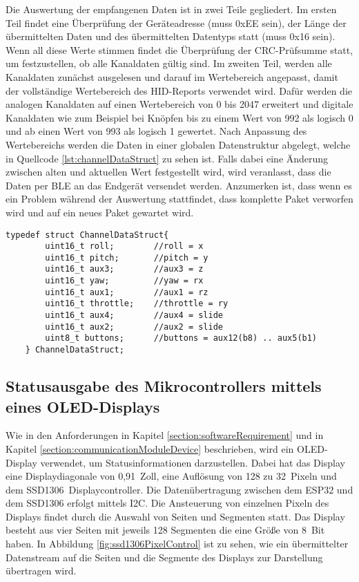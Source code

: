 Die Auswertung der empfangenen Daten ist in zwei Teile gegliedert. Im ersten Teil findet eine Überprüfung der Geräteadresse (muss 0xEE sein), der Länge der übermittelten Daten und des übermittelten Datentyps statt (muss 0x16 sein). Wenn all diese Werte stimmen findet die Überprüfung der \ac{CRC}-Prüfsumme statt, um festzustellen, ob alle Kanaldaten gültig sind. Im zweiten Teil, werden alle Kanaldaten zunächst ausgelesen und darauf im Wertebereich angepasst, damit der vollständige Wertebereich des \ac{HID}-Reports verwendet wird. Dafür werden die analogen Kanaldaten auf einen Wertebereich von 0 bis 2047 erweitert und digitale Kanaldaten wie zum Beispiel bei Knöpfen bis zu einem Wert von 992 als logisch 0 und ab einen Wert von 993 als logisch 1 gewertet. Nach Anpassung des Wertebereichs werden die Daten in einer globalen Datenstruktur abgelegt, welche in Quellcode \ref{lst:channelDataStruct} zu sehen ist. Falls dabei eine Änderung zwischen alten und aktuellen Wert festgestellt wird, wird veranlasst, dass die Daten per \ac{BLE} an das Endgerät versendet werden. Anzumerken ist, dass wenn es ein Problem während der Auswertung stattfindet, dass komplette Paket verworfen wird und auf ein neues Paket gewartet wird.

\begin{lstlisting}[caption=C-Strukuraufbau der aufbereiteten Kanaldaten, label={lst:channelDataStruct}, style=generalStyle]
    typedef struct ChannelDataStruct{
        uint16_t roll;        //roll = x
        uint16_t pitch;       //pitch = y
        uint16_t aux3;        //aux3 = z
        uint16_t yaw;         //yaw = rx
        uint16_t aux1;        //aux1 = rz
        uint16_t throttle;    //throttle = ry
        uint16_t aux4;        //aux4 = slide
        uint16_t aux2;        //aux2 = slide
        uint8_t buttons;      //buttons = aux12(b8) .. aux5(b1)
    } ChannelDataStruct;
\end{lstlisting}

\subsection{Statusausgabe des Mikrocontrollers mittels eines \acs{OLED}-Displays}
Wie in den Anforderungen in Kapitel \ref{section:softwareRequirement} und in Kapitel \ref{section:communicationModuleDevice} beschrieben, wird ein \acs{OLED}-Display verwendet, um Statusinformationen darzustellen. Dabei hat das Display eine Displaydiagonale von 0,91~Zoll, eine Auflösung von 128 zu 32~Pixeln und dem SSD1306~Displaycontroller. Die Datenübertragung zwischen dem ESP32 und dem SSD1306 erfolgt mittels \ac{I2C}. Die Ansteuerung von einzelnen Pixeln des Displays findet durch die Auswahl von Seiten und Segmenten statt. Das Display besteht aus vier Seiten mit jeweils 128 Segmenten die eine Größe von 8~Bit haben. In Abbildung \ref{fig:ssd1306PixelControl} ist zu sehen, wie ein übermittelter Datenstream auf die Seiten und die Segmente des Displays zur Darstellung übertragen wird.

